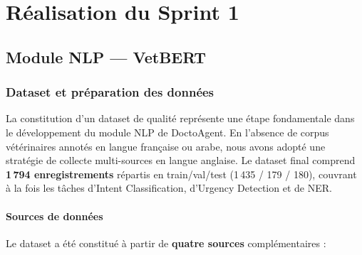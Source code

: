 \section{Réalisation du Sprint 1}

\subsection{Module NLP — VetBERT}

\subsubsection{Dataset et préparation des données}

La constitution d'un dataset de qualité représente une étape fondamentale dans le développement du module NLP de DoctoAgent. En l'absence de corpus vétérinaires annotés en langue française ou arabe, nous avons adopté une stratégie de collecte multi-sources en langue anglaise. Le dataset final comprend \textbf{1\,794 enregistrements} répartis en train/val/test (1\,435 / 179 / 180), couvrant à la fois les tâches d'Intent Classification, d'Urgency Detection et de NER.

\paragraph{Sources de données}

Le dataset a été constitué à partir de \textbf{quatre sources} complémentaires :

